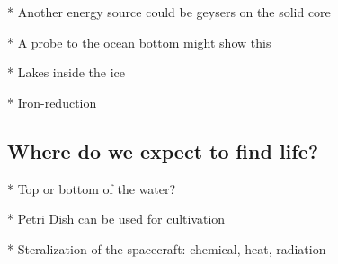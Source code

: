 * Another energy source could be geysers on the solid core

    * A probe to the ocean bottom might show this
    
* Lakes inside the ice

* Iron-reduction

\subsection{Where do we expect to find life?}

* Top or bottom of the water?

* Petri Dish can be used for cultivation

* Steralization of the spacecraft: chemical, heat, radiation
